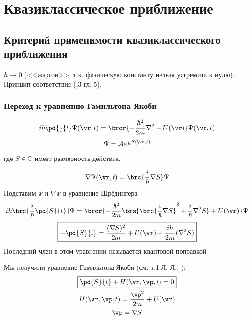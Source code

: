 \chapter{Квазиклассическое приближение}

\section{Критерий применимости квазиклассического приближения}

$\hbar \to 0$ (<<жаргон>>, т.к. физическую константу нельзя устремить к нулю). Принцип соответствия (\textsection{},3 гл. 5).

\subsection{Переход к уравнению Гамильтона-Якоби}

$$
i\hbar \pd{}{t} \Psi(\vr, t) = \brcr{-\frac{\hbar^2}{2m} \nabla^2 + U(\vr)} \Psi(\vr,t)
$$
$$
\Psi = \mathcal{A} e^{\frac{i}{\hbar}S(\vr,t)}
$$
где $S \in \mathbb{C}$ имеет размерность действия.

$$
\nabla \Psi(\vr,t) = \brc{\frac{i}{\hbar}\nabla S}\Psi
$$
Подставим $\Psi$ и $\nabla \Psi$ в уравнение Шрёдингера:
$$
i\hbar\brc{\frac{i}{\hbar}\pd{S}{t}}\Psi = 
\brcr{ -\frac{\hbar^2}{2m} \brs{ \brc{\frac{i}{\hbar}\nabla S}^2 + \frac{i}{\hbar}{\nabla^2} S} + U(\vr) } \Psi
$$
\begin{equation}
\label{eq:11_1_1}
\boxed{-\pd{S}{t} = \frac{(\nabla S)^2}{2m} + U(\vr) - \frac{i\hbar}{2m} (\nabla^2 S)}
\end{equation}
Последний член в этом уравнении называется квантовой поправкой.

Мы получили уравнение Гамильтона-Якоби (см. т.1 Л.-Л., ):
$$
\begin{gathered}
\boxed{\pd{S}{t} + H(\vr,\vp,t) = 0}\\
H(\vr,\vp,t) = \frac{\vp^2}{2m} + U(\vr) \\
\vp=\nabla S
\end{gathered}
$$

